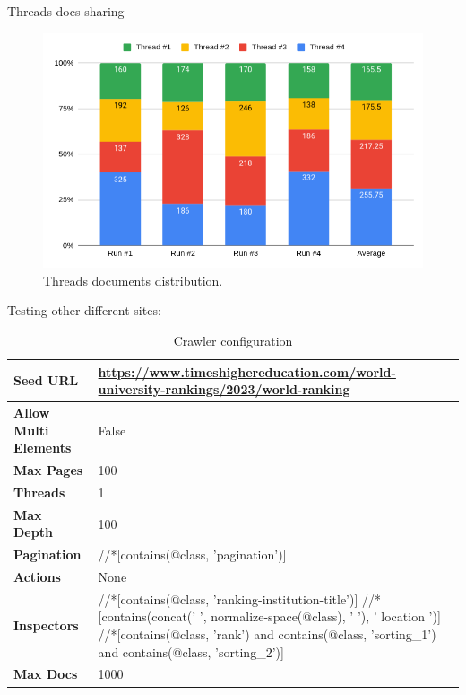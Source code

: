{Threads docs sharing

\begin{figure}[h]	
     \centering
     \includegraphics[width=13cm]{images/threads_share.png}
     \caption{Threads documents distribution.}
     \label{fig:google-arch}
\end{figure}

Testing other different sites: 

\begin{table}[ht] 
{\footnotesize
\begin{tabular}{ P{3cm} ||P{10.1cm}  }      %
 \hline \hline
\textbf{Seed URL} & \href{https://www.timeshighereducation.com/world-university-rankings/2023/world-ranking}{https://www.timeshighereducation.com/world-university-rankings/2023/world-ranking}\T\B 
\\ 
\hline
\textbf{Allow Multi Elements} & False \T\B 
\\ 
\hline
\textbf{Max Pages} & 100\T\B 
\\ 
\hline
\textbf{Threads} & 1\T\B 
\\ 
\hline
\textbf{Max Depth} & 100\T\B 
\\ 
\hline
\textbf{Pagination} & //*[contains(@class, 'pagination')]\T\B 
\\ 
\hline
\textbf{Actions} & None\T\B 
\\ 
\hline
\textbf{Inspectors} & //*[contains(@class, 'ranking-institution-title')] \newline //*[contains(concat(' ', normalize-space(@class), ' '), ' location ')] \newline //*[contains(@class, 'rank') and contains(@class, 'sorting\_1') and contains(@class, 'sorting\_2')]
\T\B 
\\ 
\hline
\textbf{Max Docs} & 1000\T\B 
\\ 
\hline \hline
    \end{tabular}
}
  \captionsetup{justification=centering,margin=2cm}
  \caption{Crawler configuration}
\end{table}



}
